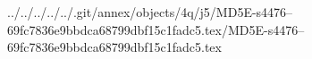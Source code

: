 ../../../../../.git/annex/objects/4q/j5/MD5E-s4476--69fc7836e9bbdca68799dbf15c1fadc5.tex/MD5E-s4476--69fc7836e9bbdca68799dbf15c1fadc5.tex